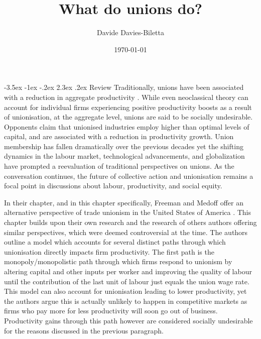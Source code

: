 \documentclass[11pt]{article}
\title{What do unions do?}
\author{Davide Davies-Biletta}
\date{\today}
\makeatletter
\newcommand{\bb}{\bigbreak\noindent}
\renewcommand\section{\leftskip 0pt\@startsection {section}{1}{\z@}%
	{-3.5ex \@plus -1ex \@minus -.2ex}%
	{2.3ex \@plus.2ex}%
	{\normalfont\Large\bfseries}}
\makeatother
\begin{document}
	\maketitle
	\setcounter{page}{1}
	\begin{spacing}{1.7}
	
	\section{Review}
	Traditionally, unions have been associated with a reduction in aggregate productivity \parencite{meltzer1965labor,kuhn1998unions}. While even neoclassical theory can account for individual firms experiencing positive productivity boosts as a result of unionisation, at the aggregate level, unions are said to be socially undesirable. Opponents claim that unionised industries employ higher than optimal levels of capital, and are associated with a reduction in productivity growth. Union membership has fallen dramatically over the previous decades yet the shifting dynamics in the labour market, technological advancements, and globalization have prompted a reevaluation of traditional perspectives on unions. As the conversation continues, the future of collective action and unionisation remains a focal point in discussions about labour, productivity, and social equity.
	
	\bb
	In their chapter, and in this chapter specifically, Freeman and Medoff offer an alternative perspective of trade unionism in the United States of America \parencite{freeman1985unions}. This chapter builds upon their own research and the research of others authors offering similar perspectives, which were deemed controversial at the time. The authors outline a model which accounts for several distinct paths through which unionisation directly impacts firm productivity. The first path is the monopoly/monopolistic path through which firms respond to unionism by altering capital and other inputs per worker and improving the quality of labour until the contribution of the last unit of labour just equals the union wage rate. This model can also account for unionisation leading to lower productivity, yet the authors argue this is actually unlikely to happen in competitive markets as firms who pay more for less productivity will soon go out of business. Productivity gains through this path however are considered socially undesirable for the reasons discussed in the previous paragraph. 
	

\end{spacing}
\end{document}
